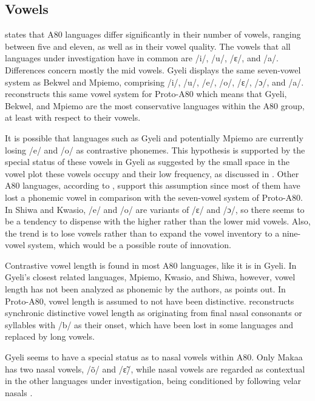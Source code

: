 \subsection{Vowels}
\largerpage
\citet[324]{cheucle2014} states that A80 languages differ significantly in their number of vowels, ranging between five and eleven, as well as in their vowel quality. The vowels that all languages under investigation have in common are /i/, /u/, /ɛ/, and /a/. Differences concern mostly the mid vowels. Gyeli displays the same seven-vowel system as Bekwel and Mpiemo, comprising /i/, /u/, /e/, /o/, /ɛ/, /ɔ/, and /a/. \citet[389]{cheucle2014} reconstructs this same vowel system for Proto-A80 which means that Gyeli, Bekwel, and Mpiemo are the most conservative languages within the A80 group, at least with respect to their vowels.

It is possible that languages such as Gyeli and potentially Mpiemo are currently losing /e/ and /o/ as contrastive phonemes. This hypothesis is supported by the special status of these vowels in Gyeli as suggested by the small space in the vowel plot these vowels occupy and their low frequency, as discussed in . Other A80 languages, according to \citet[324-325]{cheucle2014}, support this assumption  since most of them have lost a phonemic vowel in comparison with the seven-vowel system of Proto-A80.  In Shiwa and Kwasio, /e/ and /o/ are variants of /ɛ/ and /ɔ/, so there seems to be a tendency to dispense with the higher rather than the lower mid vowels. Also, the trend is to lose vowels rather than to expand the vowel inventory to a nine-vowel system, which would be a possible route of innovation.

Contrastive vowel length is found in most A80 languages, like it is in Gyeli. In Gyeli's closest related languages, Mpiemo, Kwasio, and Shiwa, however, vowel length has not been analyzed as phonemic by the authors, as \citet[327]{cheucle2014} points out. In Proto-A80, vowel length is assumed to not have been distinctive. \citet[395-396]{cheucle2014} reconstructs synchronic distinctive vowel length as originating from final nasal consonants or syllables with /b/ as their onset, which have been lost in some languages and replaced by long vowels.

Gyeli seems to have a special status as to nasal vowels within A80. Only Makaa has two nasal vowels, /õ/ and /ɛ̃/, while nasal vowels are regarded as contextual in the other languages under investigation, being conditioned by following velar nasals \citep[329, 397]{cheucle2014}.

